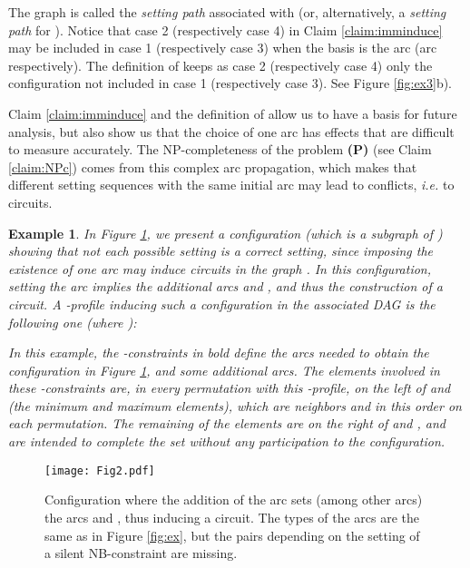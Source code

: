 \documentclass{article}
\newtheorem{ex}{Example}
\newcommand{\bex}{\begin{ex}\rm}
\newcommand{\eex}{\end{ex}}
\begin{document}
\hspace*{1.9cm}

\hspace*{1.9cm}

\medskip

\noindent The graph  is called the {\em setting path} associated with  (or, alternatively, a {\em setting path}
for ). Notice that case 2 (respectively case 4) in Claim \ref{claim:imminduce} may be included in case 1 
(respectively case 3) when the basis is the arc  (arc  respectively). The definition of
 keeps as case 2 (respectively case 4) only the configuration not included in case 1 (respectively case 3).
See Figure \ref{fig:ex3}b).


Claim \ref{claim:imminduce} and the definition of  allow us to have a basis for 
future analysis, but also show us that the
choice of one arc  has effects that are difficult to measure accurately. 
The NP-completeness of the problem {\bf (P)} (see Claim \ref{claim:NPc}) comes from 
this complex arc propagation, which makes that different setting sequences with the
same initial arc may lead to conflicts, {\em i.e.} to circuits.

\bex
In Figure \ref{fig:ex2}, we present a configuration (which is a subgraph of ) showing that not each possible
setting is a correct setting, since imposing the existence of one arc  may induce
circuits in the graph . In this configuration, setting the arc  implies the additional
arcs  and , and thus the construction of a circuit. A -profile inducing such a configuration in the
associated DAG  is the following one (where ):
\medskip

  






\medskip

\noindent In this example, the -constraints in bold define the arcs needed to obtain
the configuration in Figure \ref{fig:ex2}, and some additional arcs. The elements
involved in these -constraints are, in every permutation with this -profile,
on the left of  and  (the minimum and maximum elements), which are neighbors and
in this order on each permutation. The remaining of the elements are on the right of  
and , and are intended to complete the set  without any
participation to the configuration.
\eex

\begin{figure}[t]
\vspace*{-1.5cm}
\begin{center}
\texttt{[image: Fig2.pdf]}
\end{center}
\vspace*{-4cm}
\caption{{\small  Configuration where the addition of  the arc  sets
(among other arcs) the arcs  and , thus inducing a circuit.
The types of the arcs are the same as in Figure \ref{fig:ex}, but the pairs depending
on the setting of a silent NB-constraint are missing.}}
\label{fig:ex2}
\end{figure}
\end{document}
